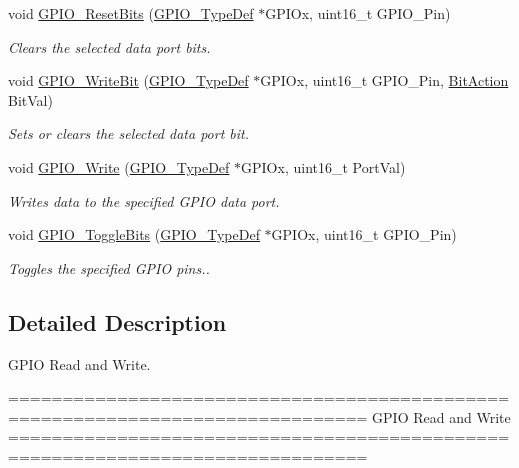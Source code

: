 \begin{DoxyCompactItemize}
void \hyperlink{group___g_p_i_o___group2_ga6fcd35b207a66608dd2c9d7de9247dc8}{G\+P\+I\+O\+\_\+\+Reset\+Bits} (\hyperlink{struct_g_p_i_o___type_def}{G\+P\+I\+O\+\_\+\+Type\+Def} $\ast$G\+P\+I\+Ox, uint16\+\_\+t G\+P\+I\+O\+\_\+\+Pin)
\begin{DoxyCompactList}\small\item\em Clears the selected data port bits. \end{DoxyCompactList}\item 
void \hyperlink{group___g_p_i_o___group2_ga8f7b237fd744d9f7456fbe0da47a9b80}{G\+P\+I\+O\+\_\+\+Write\+Bit} (\hyperlink{struct_g_p_i_o___type_def}{G\+P\+I\+O\+\_\+\+Type\+Def} $\ast$G\+P\+I\+Ox, uint16\+\_\+t G\+P\+I\+O\+\_\+\+Pin, \hyperlink{group___g_p_i_o_ga176130b21c0e719121470a6042d4cf19}{Bit\+Action} Bit\+Val)
\begin{DoxyCompactList}\small\item\em Sets or clears the selected data port bit. \end{DoxyCompactList}\item 
void \hyperlink{group___g_p_i_o___group2_gaa925f19c8547a00c7a0c269a84873bf9}{G\+P\+I\+O\+\_\+\+Write} (\hyperlink{struct_g_p_i_o___type_def}{G\+P\+I\+O\+\_\+\+Type\+Def} $\ast$G\+P\+I\+Ox, uint16\+\_\+t Port\+Val)
\begin{DoxyCompactList}\small\item\em Writes data to the specified G\+P\+IO data port. \end{DoxyCompactList}\item 
void \hyperlink{group___g_p_i_o___group2_gac1b837c66258872740d5f89f23549ab1}{G\+P\+I\+O\+\_\+\+Toggle\+Bits} (\hyperlink{struct_g_p_i_o___type_def}{G\+P\+I\+O\+\_\+\+Type\+Def} $\ast$G\+P\+I\+Ox, uint16\+\_\+t G\+P\+I\+O\+\_\+\+Pin)
\begin{DoxyCompactList}\small\item\em Toggles the specified G\+P\+IO pins.. \end{DoxyCompactList}\end{DoxyCompactItemize}


\subsection{Detailed Description}
G\+P\+IO Read and Write. 

\begin{DoxyVerb} ===============================================================================
                              GPIO Read and Write
 ===============================================================================  \end{DoxyVerb}
 

